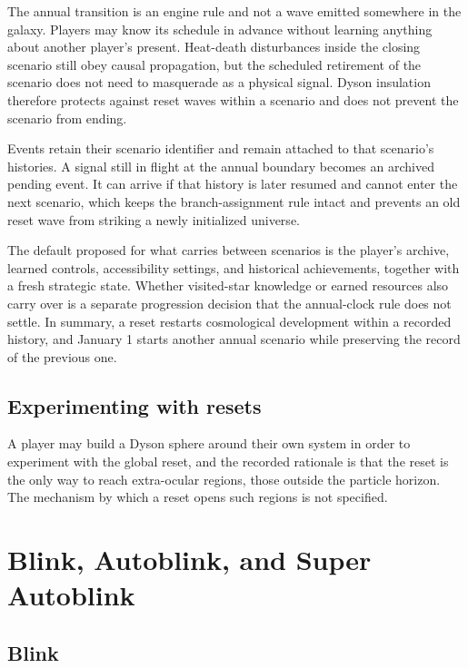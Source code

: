 \documentclass[11pt]{article}
\begin{document}
The annual transition is an engine rule and not a wave emitted somewhere in the galaxy. Players may know its schedule in advance without learning anything about another player's present. Heat-death disturbances inside the closing scenario still obey causal propagation, but the scheduled retirement of the scenario does not need to masquerade as a physical signal. Dyson insulation therefore protects against reset waves within a scenario and does not prevent the scenario from ending.

Events retain their scenario identifier and remain attached to that scenario's histories. A signal still in flight at the annual boundary becomes an archived pending event. It can arrive if that history is later resumed and cannot enter the next scenario, which keeps the branch-assignment rule intact and prevents an old reset wave from striking a newly initialized universe.

The default proposed for what carries between scenarios is the player's archive, learned controls, accessibility settings, and historical achievements, together with a fresh strategic state. Whether visited-star knowledge or earned resources also carry over is a separate progression decision that the annual-clock rule does not settle. In summary, a reset restarts cosmological development within a recorded history, and January 1 starts another annual scenario while preserving the record of the previous one.

\subsection{Experimenting with resets}

A player may build a Dyson sphere around their own system in order to experiment with the global reset, and the recorded rationale is that the reset is the only way to reach extra-ocular regions, those outside the particle horizon. The mechanism by which a reset opens such regions is not specified.

\section{Blink, Autoblink, and Super Autoblink}
\label{sec:blink}

\subsection{Blink}
\end{document}
